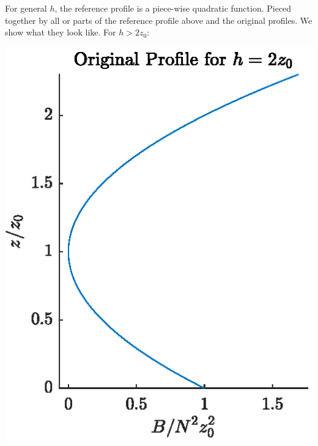 \documentclass[11pt,letterpaper]{book}
\theoremstyle{definition}
\begin{document}
For general $h$, the reference profile is a piece-wise quadratic function. Pieced together by all or parts of the reference profile above and the original profiles. We show what they look like. For $h>2z_0$:
\begin{center}
\includegraphics[scale=1]{Fig/hgg2z0_org}\;\;

\end{center}
\end{document}
